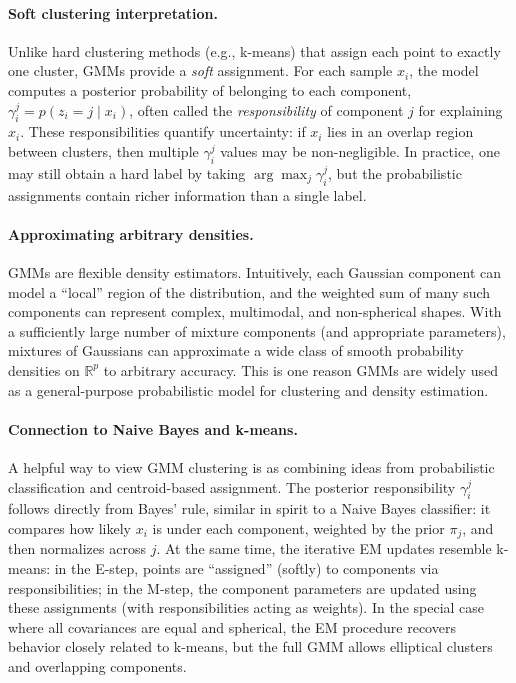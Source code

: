 \documentclass{article}
\begin{document}
\paragraph{Soft clustering interpretation.}
Unlike hard clustering methods (e.g., k-means) that assign each point to exactly one cluster, GMMs provide a \emph{soft} assignment. For each sample $x_i$, the model computes a posterior probability of belonging to each component,
$\gamma_i^j = p(z_i=j \mid x_i)$, often called the \emph{responsibility} of component $j$ for explaining $x_i$. These responsibilities quantify uncertainty: if $x_i$ lies in an overlap region between clusters, then multiple $\gamma_i^j$ values may be non-negligible. In practice, one may still obtain a hard label by taking $\arg\max_j \gamma_i^j$, but the probabilistic assignments contain richer information than a single label.

\paragraph{Approximating arbitrary densities.}
GMMs are flexible density estimators. Intuitively, each Gaussian component can model a “local” region of the distribution, and the weighted sum of many such components can represent complex, multimodal, and non-spherical shapes. With a sufficiently large number of mixture components (and appropriate parameters), mixtures of Gaussians can approximate a wide class of smooth probability densities on $\mathbb{R}^p$ to arbitrary accuracy. This is one reason GMMs are widely used as a general-purpose probabilistic model for clustering and density estimation.

\paragraph{Connection to Naive Bayes and k-means.}
A helpful way to view GMM clustering is as combining ideas from probabilistic classification and centroid-based assignment. The posterior responsibility $\gamma_i^j$ follows directly from Bayes’ rule, similar in spirit to a Naive Bayes classifier: it compares how likely $x_i$ is under each component, weighted by the prior $\pi_j$, and then normalizes across $j$. At the same time, the iterative EM updates resemble k-means: in the E-step, points are “assigned” (softly) to components via responsibilities; in the M-step, the component parameters are updated using these assignments (with responsibilities acting as weights). In the special case where all covariances are equal and spherical, the EM procedure recovers behavior closely related to k-means, but the full GMM allows elliptical clusters and overlapping components.
\end{document}
